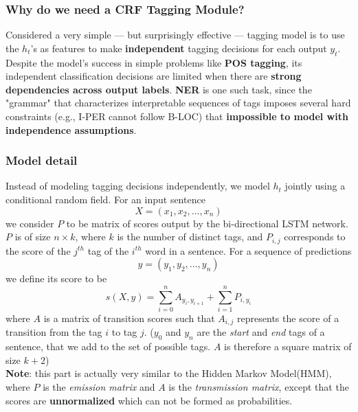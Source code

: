\documentclass[a3paper, 12pt]{book} %
\begin{document}
\subsubsection{Why do we need a CRF Tagging Module?}
Considered a very simple --- but surprisingly effective --- tagging model is to use the $h_t$'s as features to make \textbf{independent} tagging decisions for each output $y_t$. Despite the model's success in simple problems like \textbf{POS tagging}, its independent classification decisions are limited when there are \textbf{strong dependencies across output labels}. \textbf{NER} is one such task, since the "grammar" that characterizes interpretable sequences of tags imposes several hard constraints (e.g., I-PER cannot follow B-LOC) that \textbf{impossible to model with independence assumptions}.

\subsubsection{Model detail}
Instead of modeling tagging decisions independently, we model $h_t$ jointly using a conditional random field. For an input sentence 
$$X=(x_1, x_2,...,x_n)$$
we consider $P$ to be matrix of scores output by the bi-directional LSTM network. $P$ is of size $n\times k$, where $k$ is the number of distinct tags, and $P_{i,j}$ corresponds to the score of the $j^{th}$ tag of the $i^{th}$ word in a sentence. For a sequence of predictions 
$$y=(y_1,y_2,...,y_n)$$
we define its score to be 
\begin{equation}
s(X,y)=\sum_{i=0}^{n}{A_{y_i,y_{i+1}}}+\sum_{i=1}^{n}{P_{i,y_i}}
\end{equation}
where $A$ is a matrix of transition scores such that $A_{i,j}$ represents the score of a transition from the tag $i$ to tag $j$. ($y_0$ and $y_n$ are the \emph{start} and \emph{end} tags of a sentence, that we add to the set of possible tags. $A$ is therefore a square matrix of size $k+2$) \\

\textbf{Note}: this part is actually very similar to the Hidden Markov Model(HMM), where $P$ is the \emph{emission matrix} and $A$ is the \emph{transmission matrix}, except that the scores are \textbf{unnormalized} which can not be formed as probabilities. \\
\end{document}
